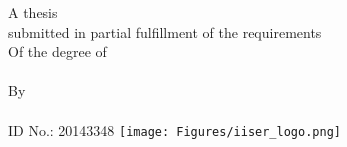 \documentclass[
11pt, %
english, %
singlespacing, %
headsepline, %
]{MastersDoctoralThesis} %
\author{\textbf{Vinay Hegde}} %
\begin{document}
\frontmatter %

\pagestyle{plain} %


\begin{titlepage}
\begin{center}

{\huge \bfseries \ttitle\par}\vspace{0.4cm} %

\vfill
\Large A thesis\\\vspace{0.5cm} submitted in partial fulfillment of the requirements\\\vspace{2cm} Of the degree of\\\vspace{0.5cm} \degreename\\[0.3cm] %
\vspace{1.5cm}By\\\vspace{1cm}
\authorname\\
ID No.: 20143348
\vfill
\vspace{1cm}
\texttt{[image: Figures/iiser\_logo.png]} %

\vspace*{.06\textheight}
{\scshape\LARGE \univname\par}\vspace{1.5cm} %

 

\end{center}
\end{titlepage}
\end{document}

